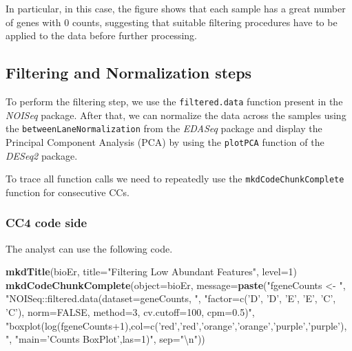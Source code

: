 \documentclass[]{article}
\newenvironment{Shaded}{\begin{snugshade}}{\end{snugshade}}
\newcommand{\CharTok}[1]{\textcolor[rgb]{0.31,0.60,0.02}{#1}}
\newcommand{\DataTypeTok}[1]{\textcolor[rgb]{0.13,0.29,0.53}{#1}}
\newcommand{\DecValTok}[1]{\textcolor[rgb]{0.00,0.00,0.81}{#1}}
\newcommand{\KeywordTok}[1]{\textcolor[rgb]{0.13,0.29,0.53}{\textbf{#1}}}
\newcommand{\NormalTok}[1]{#1}
\newcommand{\StringTok}[1]{\textcolor[rgb]{0.31,0.60,0.02}{#1}}
\begin{document}
In particular, in this case, the figure shows that each sample has a
great number of genes with 0 counts, suggesting that suitable filtering
procedures have to be applied to the data before further processing.

\hypertarget{filtering-and-normalization-steps}{%
\subsection{Filtering and Normalization
steps}\label{filtering-and-normalization-steps}}

To perform the filtering step, we use the \texttt{filtered.data}
function present in the \emph{NOISeq} package. After that, we can
normalize the data across the samples using the
\texttt{betweenLaneNormalization} from the \emph{EDASeq} package and
display the Principal Component Analysis (PCA) by using the
\texttt{plotPCA} function of the \emph{DESeq2} package.

To trace all function calls we need to repeatedly use the
\texttt{mkdCodeChunkComplete} function for consecutive CCs.

\hypertarget{cc4-code-side}{%
\subsubsection{CC4 code side}\label{cc4-code-side}}

The analyst can use the following code.

\begin{Shaded}
\begin{Highlighting}[]
\KeywordTok{mkdTitle}\NormalTok{(bioEr, }\DataTypeTok{title=}\StringTok{"Filtering Low Abundant Features"}\NormalTok{, }\DataTypeTok{level=}\DecValTok{1}\NormalTok{)}
\KeywordTok{mkdCodeChunkComplete}\NormalTok{(}\DataTypeTok{object=}\NormalTok{bioEr, }\DataTypeTok{message=}\KeywordTok{paste}\NormalTok{(}\StringTok{"fgeneCounts <- "}\NormalTok{,}
              \StringTok{"NOISeq::filtered.data(dataset=geneCounts, "}\NormalTok{,}
              \StringTok{"factor=c('D', 'D', 'E', 'E', 'C', 'C'), norm=FALSE, method=3, cv.cutoff=100, cpm=0.5)"}\NormalTok{,}
              \StringTok{"boxplot(log(fgeneCounts+1),col=c('red','red','orange','orange','purple','purple'), "}\NormalTok{,}
              \StringTok{"main='Counts BoxPlot',las=1)"}\NormalTok{, }\DataTypeTok{sep=}\StringTok{"}\CharTok{\textbackslash{}n}\StringTok{"}\NormalTok{))}
\end{Highlighting}
\end{Shaded}
\end{document}

